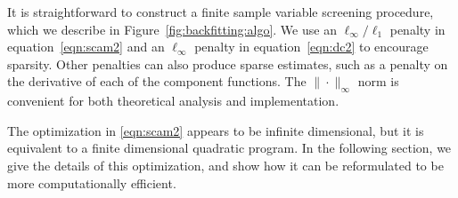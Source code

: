 It is straightforward to construct a finite sample variable screening procedure, which we describe in Figure~\ref{fig:backfitting:algo}.
We use an $\ell_\infty/\ell_1$ penalty in equation~\eqref{eqn:scam2}
and an $\ell_\infty$ penalty in equation~\eqref{eqn:dc2} to encourage
sparsity.  Other penalties can also produce
sparse estimates, such as a penalty on the derivative of each of the
component functions.  The $\|\cdot\|_\infty$ norm is convenient for both
theoretical analysis and implementation.

The optimization in \eqref{eqn:scam2} appears to be infinite
dimensional, but it is equivalent to a finite dimensional quadratic
program.  In the following section, we give the details
of this optimization, and show how it can be reformulated
to be more computationally efficient.



